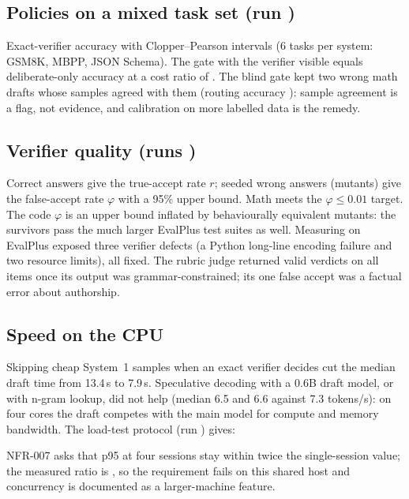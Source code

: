 \documentclass[11pt]{article}
\begin{document}
\subsection{Policies on a mixed task set (run \PhaseTwoRun)}
\begin{center}\PhaseTwoTable\end{center}
Exact-verifier accuracy with Clopper--Pearson intervals (6 tasks per system: GSM8K, MBPP, JSON Schema). The gate with the verifier visible equals deliberate-only accuracy at a cost ratio of \GatedCostRatio. The blind gate kept two wrong math drafts whose samples agreed with them (routing accuracy \BlindRouting): sample agreement is a flag, not evidence, and calibration on more labelled data is the remedy.

\subsection{Verifier quality (runs \RatesRuns)}
\begin{center}\VerifierTable\end{center}
Correct answers give the true-accept rate $r$; seeded wrong answers (mutants) give the false-accept rate $\varphi$ with a 95\% upper bound. Math meets the $\varphi\le0.01$ target. The code $\varphi$ is an upper bound inflated by behaviourally equivalent mutants: the survivors pass the much larger EvalPlus test suites as well. Measuring on EvalPlus exposed three verifier defects (a Python long-line encoding failure and two resource limits), all fixed. The rubric judge returned valid verdicts on all items once its output was grammar-constrained; its one false accept was a factual error about authorship.

\subsection{Speed on the CPU}
Skipping cheap System~1 samples when an exact verifier decides cut the median draft time from 13.4\,s to 7.9\,s. Speculative decoding with a 0.6B draft model, or with n-gram lookup, did not help (median 6.5 and 6.6 against 7.3 tokens/s): on four cores the draft competes with the main model for compute and memory bandwidth. The load-test protocol (run \ProtocolRun) gives:
\begin{center}\ProtocolTable\end{center}
NFR-007 asks that p95 at four sessions stay within twice the single-session value; the measured ratio is \NfrSevenRatio, so the requirement fails on this shared host and concurrency is documented as a larger-machine feature.
\end{document}
